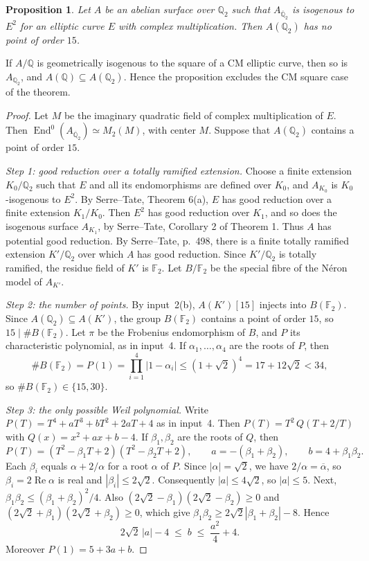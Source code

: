 \documentclass[11pt]{article}
\newtheorem{proposition}[lemma]{Proposition}
\newcommand{\Q}{\mathbb Q}
\newcommand{\F}{\mathbb F}
\DeclareMathOperator{\End}{End}
\begin{document}
\begin{proposition}\label{prop:cm}
Let \(A\) be an abelian surface over \(\Q_2\) such that
\(A_{\overline{\Q}_2}\) is isogenous to \(E^2\) for an elliptic curve
\(E\) with complex multiplication. Then \(A(\Q_2)\) has no point of
order \(15\).
\end{proposition}

If \(A/\Q\) is geometrically isogenous to the square of a CM elliptic
curve, then so is \(A_{\Q_2}\), and \(A(\Q)\subseteq A(\Q_2)\). Hence
the proposition excludes the CM square case of the theorem.

\begin{proof}
Let \(M\) be the imaginary quadratic field of complex multiplication
of \(E\). Then \(\End^0(A_{\overline{\Q}_2})\simeq M_2(M)\), with
center \(M\). Suppose that \(A(\Q_2)\) contains a point of order
\(15\).

\emph{Step 1: good reduction over a totally ramified extension.}
Choose a finite extension \(K_0/\Q_2\) such that \(E\) and all its
endomorphisms are defined over \(K_0\), and \(A_{K_0}\) is
\(K_0\)-isogenous to \(E^2\). By Serre--Tate, Theorem 6(a), \(E\) has
good reduction over a finite extension \(K_1/K_0\). Then \(E^2\) has
good reduction over \(K_1\), and so does the isogenous surface
\(A_{K_1}\), by Serre--Tate, Corollary 2 of Theorem 1. Thus \(A\) has
potential good reduction. By Serre--Tate, p.~498, there is a finite
totally ramified extension \(K'/\Q_2\) over which \(A\) has good
reduction. Since \(K'/\Q_2\) is totally ramified, the residue field of
\(K'\) is \(\F_2\). Let \(B/\F_2\) be the special fibre of the N\'eron
model of \(A_{K'}\).

\emph{Step 2: the number of points.} By input~2(b), \(A(K')[15]\)
injects into \(B(\F_2)\). Since \(A(\Q_2)\subseteq A(K')\), the group
\(B(\F_2)\) contains a point of order \(15\), so
\(15\mid\#B(\F_2)\). Let \(\pi\) be the Frobenius endomorphism of
\(B\), and \(P\) its characteristic polynomial, as in input~4. If
\(\alpha_1,\ldots,\alpha_4\) are the roots of \(P\), then
\[
 \#B(\F_2)=P(1)=\prod_{i=1}^4|1-\alpha_i|\le(1+\sqrt2)^4
 =17+12\sqrt2<34,
\]
so \(\#B(\F_2)\in\{15,30\}\).

\emph{Step 3: the only possible Weil polynomial.} Write
\(P(T)=T^4+aT^3+bT^2+2aT+4\) as in input~4. Then
\(P(T)=T^2\,Q(T+2/T)\) with \(Q(x)=x^2+ax+b-4\). If
\(\beta_1,\beta_2\) are the roots of \(Q\), then
\[
 P(T)=(T^2-\beta_1T+2)(T^2-\beta_2T+2),\qquad
 a=-(\beta_1+\beta_2),\qquad b=4+\beta_1\beta_2 .
\]
Each \(\beta_i\) equals \(\alpha+2/\alpha\) for a root \(\alpha\) of
\(P\). Since \(|\alpha|=\sqrt2\), we have \(2/\alpha=\overline\alpha\),
so \(\beta_i=2\operatorname{Re}\alpha\) is real and
\(|\beta_i|\le2\sqrt2\). Consequently \(|a|\le4\sqrt2\), so
\(|a|\le5\). Next, \(\beta_1\beta_2\le(\beta_1+\beta_2)^2/4\). Also
\((2\sqrt2-\beta_1)(2\sqrt2-\beta_2)\ge0\) and
\((2\sqrt2+\beta_1)(2\sqrt2+\beta_2)\ge0\), which give
\(\beta_1\beta_2\ge2\sqrt2|\beta_1+\beta_2|-8\). Hence
\begin{equation}\label{eq:bounds}
 2\sqrt2\,|a|-4\;\le\;b\;\le\;\frac{a^2}{4}+4.
\end{equation}
Moreover \(P(1)=5+3a+b\).


\end{proof}
\end{document}
